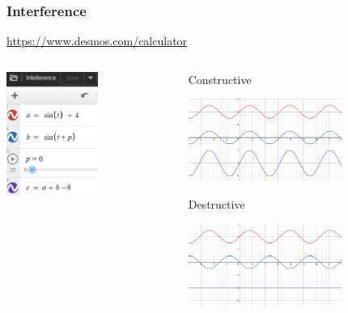 \documentclass{beamer}
\begin{document}
\begin{frame}\frametitle{Interference}
\url{https://www.desmos.com/calculator}

\begin{columns}
\begin{column}{4cm}
\begin{center}
\includegraphics[width=3cm]{fig/desmos3.png}
\end{center}
\end{column}
\begin{column}{7cm}
\begin{center}
Constructive

\includegraphics[width=5cm]{fig/desmos4.png}

Destructive

\includegraphics[width=5cm]{fig/desmos5.png}
\end{center}
\end{column}
\end{columns}
\end{frame}
\end{document}
